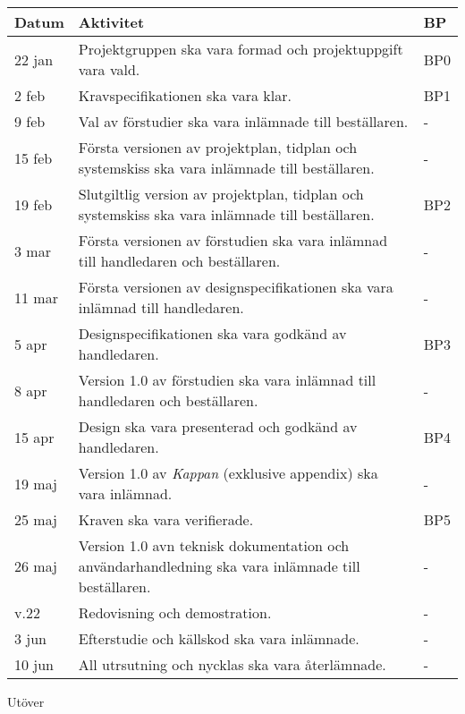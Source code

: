 \documentclass[11pt]{article}
\begin{document}
\begin{flushleft}
\begin{center}
\begin{longtable}{| p{.1\linewidth}|p{.7\linewidth} | p{.1\linewidth} |} \hline
\textbf{Datum} & \textbf{Aktivitet} & \textbf{BP} \\ \hline
22 jan & Projektgruppen ska vara formad och projektuppgift vara vald. & BP0 \\ \hline
2 feb & Kravspecifikationen ska vara klar. & BP1 \\ \hline
9 feb & Val av förstudier ska vara inlämnade till beställaren. & - \\ \hline
15 feb & Första versionen av projektplan, tidplan och systemskiss ska vara inlämnade till beställaren. & - \\ \hline
19 feb & Slutgiltlig version av projektplan, tidplan och systemskiss ska vara inlämnade till beställaren.& BP2 \\ \hline
3 mar & Första versionen av förstudien ska vara inlämnad till handledaren och beställaren. & - \\ \hline
11 mar & Första versionen av designspecifikationen ska vara inlämnad till handledaren. & - \\ \hline
5 apr & Designspecifikationen ska vara godkänd av handledaren. & BP3 \\ \hline
8 apr & Version 1.0 av förstudien ska vara inlämnad till handledaren och beställaren. & - \\ \hline
15 apr & Design ska vara presenterad och godkänd av handledaren. & BP4 \\ \hline
19 maj & Version 1.0 av \textit{Kappan} (exklusive appendix) ska vara inlämnad. & - \\ \hline
25 maj & Kraven ska vara verifierade.  & BP5 \\ \hline
26 maj & Version 1.0 avn teknisk dokumentation och användarhandledning ska vara inlämnade till beställaren. & - \\ \hline
v.22 &  Redovisning och demostration. & - \\ \hline
3 jun & Efterstudie och källskod ska vara inlämnade. & - \\ \hline
10 jun & All utrsutning och nycklas ska vara återlämnade. & - \\ \hline
\end{longtable}
\end{center}

Utöver 

\begin{center}
\begin{longtable}{|l|l|p{.65\linewidth}|l|} \hline


\end{longtable}
\end{center}
\end{flushleft}
\end{document}
